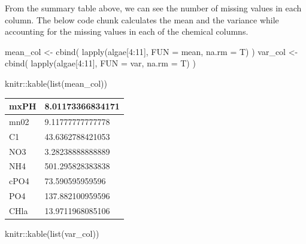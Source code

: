 \documentclass[
]{article}
\newenvironment{Shaded}{\begin{snugshade}}{\end{snugshade}}
\newcommand{\AttributeTok}[1]{\textcolor[rgb]{0.77,0.63,0.00}{#1}}
\newcommand{\DecValTok}[1]{\textcolor[rgb]{0.00,0.00,0.81}{#1}}
\newcommand{\FunctionTok}[1]{\textcolor[rgb]{0.00,0.00,0.00}{#1}}
\newcommand{\NormalTok}[1]{#1}
\newcommand{\OtherTok}[1]{\textcolor[rgb]{0.56,0.35,0.01}{#1}}
\newcommand{\SpecialCharTok}[1]{\textcolor[rgb]{0.00,0.00,0.00}{#1}}
\begin{document}
From the summary table above, we can see the number of missing values in
each column. The below code chunk calculates the mean and the variance
while accounting for the missing values in each of the chemical columns.

\begin{Shaded}
\begin{Highlighting}[]
\NormalTok{mean\_col }\OtherTok{\textless{}{-}} \FunctionTok{cbind}\NormalTok{(}
  \FunctionTok{lapply}\NormalTok{(algae[}\DecValTok{4}\SpecialCharTok{:}\DecValTok{11}\NormalTok{], }\AttributeTok{FUN =}\NormalTok{ mean, }\AttributeTok{na.rm =}\NormalTok{ T)}
\NormalTok{)}
\NormalTok{var\_col }\OtherTok{\textless{}{-}} \FunctionTok{cbind}\NormalTok{(}
  \FunctionTok{lapply}\NormalTok{(algae[}\DecValTok{4}\SpecialCharTok{:}\DecValTok{11}\NormalTok{], }\AttributeTok{FUN =}\NormalTok{ var, }\AttributeTok{na.rm =}\NormalTok{ T)}
\NormalTok{)}

\NormalTok{knitr}\SpecialCharTok{::}\FunctionTok{kable}\NormalTok{(}\FunctionTok{list}\NormalTok{(mean\_col))}
\end{Highlighting}
\end{Shaded}

\begin{table}

\centering
\begin{tabular}[t]{l|l}
\hline
mxPH & 8.01173366834171\\
\hline
mn02 & 9.11777777777778\\
\hline
C1 & 43.6362788421053\\
\hline
NO3 & 3.28238888888889\\
\hline
NH4 & 501.295828383838\\
\hline
cPO4 & 73.590595959596\\
\hline
PO4 & 137.882100959596\\
\hline
CHla & 13.9711968085106\\
\hline
\end{tabular}
\end{table}

\begin{Shaded}
\begin{Highlighting}[]
\NormalTok{knitr}\SpecialCharTok{::}\FunctionTok{kable}\NormalTok{(}\FunctionTok{list}\NormalTok{(var\_col))}
\end{Highlighting}
\end{Shaded}
\end{document}
